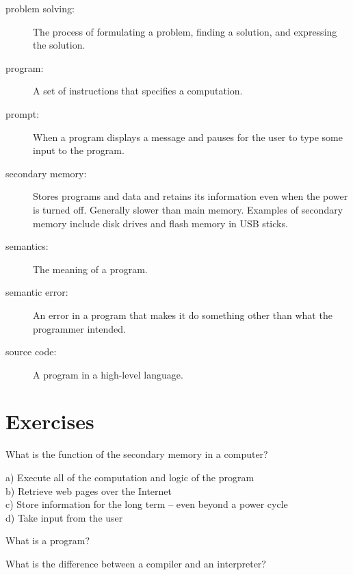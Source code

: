 \begin{description}
\item[problem solving:]  The process of formulating a problem, finding
a solution, and expressing the solution.

\item[program:] A set of instructions that specifies a computation.

\item[prompt:] When a program displays a message and pauses for the 
user to type some input to the program.

\item[secondary memory:] Stores programs and data and retains its 
information even when the power is turned off.  Generally slower 
than main memory.  Examples of secondary memory include disk 
drives and flash memory in USB sticks.

\item[semantics:]  The meaning of a program.

\item[semantic error:]   An error in a program that makes it do something
other than what the programmer intended.

\item[source code:]  A program in a high-level language.

\end{description}

\section{Exercises}


\begin{ex}
What is the function of the secondary memory in a computer?

a) Execute all of the computation and logic of the program\\
b) Retrieve web pages over the Internet\\
c) Store information for the long term -- even beyond a power cycle\\
d) Take input from the user 
\end{ex}

\begin{ex}
What is a program?
\end{ex}

\begin{ex}
What is the difference between a compiler and an interpreter?
\end{ex}

